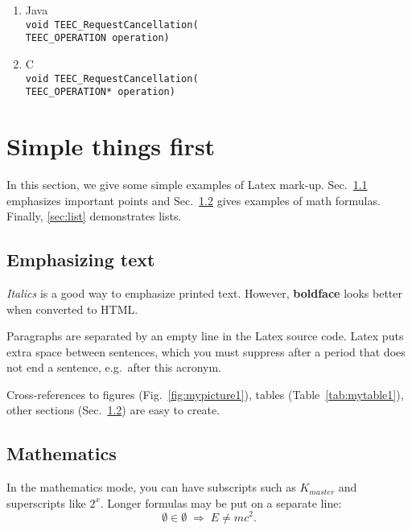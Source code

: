 \documentclass{cseminar}
\begin{document}
\begin{enumerate}
	\item Java\\
				\texttt{void TEEC\_RequestCancellation(
				\\TEEC\_OPERATION operation)
				}
	\item[] C\\
				\texttt{void TEEC\_RequestCancellation(
				\\TEEC\_OPERATION* operation)
				}


\end{enumerate}


\iffalse

\section{Simple things first}

In this section, we give some simple examples of Latex mark-up.
Sec.~\ref{sec:emphasis} emphasizes important points and
Sec.~\ref{sec:math} gives examples of math formulas.
Finally, \ref{sec:list} demonstrates lists.




\subsection{Emphasizing text}
\label{sec:emphasis}

\textit{Italics} is a good way to emphasize printed text. However,
\textbf{boldface} looks better when converted to HTML.

Paragraphs are separated by an empty line in the Latex source code.
Latex puts extra space between sentences, which you must suppress
after a period that does not end a sentence, e.g.\ after this acronym.

Cross-references to figures (Fig.~\ref{fig:mypicture1}), tables
(Table~\ref{tab:mytable1}), other sections (Sec.~\ref{sec:math})
are easy to create. 




\subsection{Mathematics}
\label{sec:math}

In the mathematics mode, you can have subscripts such as $K_{master}$
and superscripts like $2^x$. Longer formulas may be put on a separate
line:
\[ \emptyset \in \emptyset \; \Rightarrow \; E \neq mc^2. \]
\end{document}
